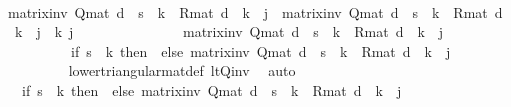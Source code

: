 \begin{isabellebody}
\ \ \isamarkupfalse%
\ {\isacharminus}{\kern0pt}\ \isanewline
\ \ \ \ \isamarkupfalse%
\ {\isachardoublequoteopen}matrix{\isacharunderscore}{\kern0pt}inv\ {\isacharparenleft}{\kern0pt}Q{\isacharunderscore}{\kern0pt}mat\ d{\isacharparenright}{\kern0pt}\ {\isachardollar}{\kern0pt}\ s\ {\isachardollar}{\kern0pt}\ k\ {\isacharasterisk}{\kern0pt}\ R{\isacharunderscore}{\kern0pt}mat\ d\ {\isachardollar}{\kern0pt}\ k\ {\isachardollar}{\kern0pt}\ j\ {\isacharequal}{\kern0pt}\ matrix{\isacharunderscore}{\kern0pt}inv\ {\isacharparenleft}{\kern0pt}Q{\isacharunderscore}{\kern0pt}mat\ d{\isacharprime}{\kern0pt}{\isacharparenright}{\kern0pt}\ {\isachardollar}{\kern0pt}\ s\ {\isachardollar}{\kern0pt}\ k\ {\isacharasterisk}{\kern0pt}\ R{\isacharunderscore}{\kern0pt}mat\ d{\isacharprime}{\kern0pt}\ {\isachardollar}{\kern0pt}\ k\ {\isachardollar}{\kern0pt}\ j{\isachardoublequoteclose}\ \ k\ j\isanewline
\ \ \ \ \isamarkupfalse%
\ {\isacharminus}{\kern0pt}\ \isanewline
\ \ \ \ \ \ \isamarkupfalse%
\ {\isachardoublequoteopen}matrix{\isacharunderscore}{\kern0pt}inv\ {\isacharparenleft}{\kern0pt}Q{\isacharunderscore}{\kern0pt}mat\ d{\isacharparenright}{\kern0pt}\ {\isachardollar}{\kern0pt}\ s\ {\isachardollar}{\kern0pt}\ k\ {\isacharasterisk}{\kern0pt}\ R{\isacharunderscore}{\kern0pt}mat\ d\ {\isachardollar}{\kern0pt}\ k\ {\isachardollar}{\kern0pt}\ j\ {\isacharequal}{\kern0pt}\ \isanewline
\ \ \ \ \ \ \ \ \ \ {\isacharparenleft}{\kern0pt}if\ s\ {\isacharless}{\kern0pt}\ k\ then\ {}\ else\ matrix{\isacharunderscore}{\kern0pt}inv\ {\isacharparenleft}{\kern0pt}Q{\isacharunderscore}{\kern0pt}mat\ d{\isacharparenright}{\kern0pt}\ {\isachardollar}{\kern0pt}\ s\ {\isachardollar}{\kern0pt}\ k\ {\isacharasterisk}{\kern0pt}\ R{\isacharunderscore}{\kern0pt}mat\ d\ {\isachardollar}{\kern0pt}\ k\ {\isachardollar}{\kern0pt}\ j{\isacharparenright}{\kern0pt}{\isachardoublequoteclose}\isanewline
\ \ \ \ \ \ \ \ \isamarkupfalse%
\ lower{\isacharunderscore}{\kern0pt}triangular{\isacharunderscore}{\kern0pt}mat{\isacharunderscore}{\kern0pt}def\ lt{\isacharunderscore}{\kern0pt}Q{\isacharunderscore}{\kern0pt}inv\ \isamarkupfalse%
\ auto\isanewline
\ \ \ \ \ \ \isamarkupfalse%
\ \isamarkupfalse%
\ {\isachardoublequoteopen}{\isasymdots}\ {\isacharequal}{\kern0pt}\ {\isacharparenleft}{\kern0pt}if\ s\ {\isacharless}{\kern0pt}\ k\ then\ {}\ else\ matrix{\isacharunderscore}{\kern0pt}inv\ {\isacharparenleft}{\kern0pt}Q{\isacharunderscore}{\kern0pt}mat\ d{\isacharprime}{\kern0pt}{\isacharparenright}{\kern0pt}\ {\isachardollar}{\kern0pt}\ s\ {\isachardollar}{\kern0pt}\ k\ {\isacharasterisk}{\kern0pt}\ R{\isacharunderscore}{\kern0pt}mat\ d\ {\isachardollar}{\kern0pt}\ k\ {\isachardollar}{\kern0pt}\ j{\isacharparenright}{\kern0pt}{\isachardoublequoteclose}\isanewline

\end{isabellebody}
